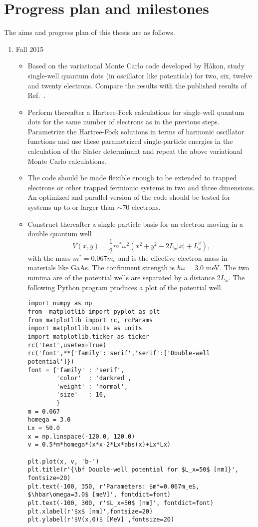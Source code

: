 \documentclass[twocolumn]{revtex4}
\begin{document}
\section*{Progress plan and milestones}
The aims and progress plan of this thesis are as follows.
\begin{enumerate}
\item Fall 2015
\begin{itemize}
\item Based on the variational Monte Carlo code developed by H\aa kon, study single-well quantum dots (in oscillator like potentials) for two, six, twelve and twenty electrons. Compare the results with the published results
of Ref.~\cite{us2011}. 
\item Perform thereafter a Hartree-Fock calculations for single-well quantum dots for the same number of electrons as in the previous steps. Parametrize the Hartree-Fock solutions in terms of harmonic oscillator functions and 
use these parametrized single-particle energies in the calculation of the Slater determinant and repeat the above
variational Monte Carlo calculations.
\item The code should be made flexible enough to be extended to trapped electrons or other trapped
fermionic systems in two and three dimensions. An optimized and parallel version of the code should be tested
for systems up to or larger than $\sim 70$ electrons. 
\item Construct thereafter a single-particle basis for an electron moving in a double quantum well
\[
V(x,y) = \frac{1}{2} m^*\omega^2(x^2+y^2-2L_x\vert x\vert +L_x^2),
\]
with the mass $m^*=0.067m_e$ and is the effective electron mass in materials like GaAs. The confinment strength is
$\hbar\omega = 3.0$ meV. The two minima are of the potential wells are separated by a distance $2L_x$. The following Python program produces a plot of the potential well.
\begin{verbatim}
import numpy as np
from  matplotlib import pyplot as plt
from matplotlib import rc, rcParams
import matplotlib.units as units
import matplotlib.ticker as ticker
rc('text',usetex=True)
rc('font',**{'family':'serif','serif':['Double-well potential']})
font = {'family' : 'serif',
        'color'  : 'darkred',
        'weight' : 'normal',
        'size'   : 16,
        }
m = 0.067
homega = 3.0
Lx = 50.0
x = np.linspace(-120.0, 120.0)
v = 0.5*m*homega*(x*x-2*Lx*abs(x)+Lx*Lx)

plt.plot(x, v, 'b-')
plt.title(r'{\bf Double-well potential for $L_x=50$ [nm]}', fontsize=20)     
plt.text(-100, 350, r'Parameters: $m*=0.067m_e$, $\hbar\omega=3.0$ [meV]', fontdict=font)
plt.text(-100, 300, r'$L_x=50$ [nm]', fontdict=font)
plt.xlabel(r'$x$ [nm]',fontsize=20)
plt.ylabel(r'$V(x,0)$ [MeV]',fontsize=20)


\end{verbatim}
\end{itemize}
\end{enumerate}
\end{document}
